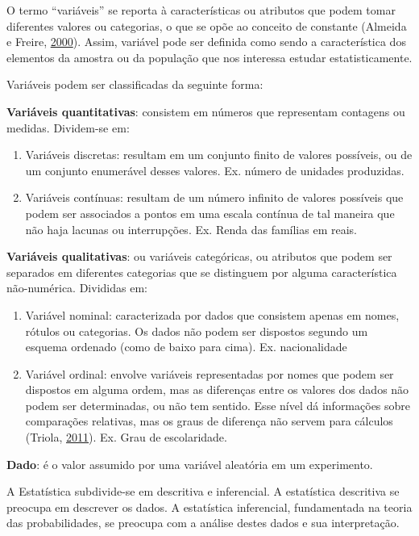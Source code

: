 \documentclass[12pt,brazil,oneside]{book}
\begin{document}
O termo ``variáveis'' se reporta à características ou atributos que podem tomar diferentes valores ou categorias, o que se opõe ao conceito de constante (Almeida e Freire, \protect\hyperlink{ref-almeida2000}{2000}). Assim, variável pode ser definida como sendo a característica dos elementos da amostra ou da população que nos interessa estudar estatisticamente.

Variáveis podem ser classificadas da seguinte forma:

\textbf{Variáveis quantitativas}: consistem em números que representam contagens ou medidas. Dividem-se em:

\begin{enumerate}
\def\labelenumi{\alph{enumi})}
\item
  Variáveis discretas: resultam em um conjunto finito de valores possíveis, ou de um conjunto enumerável desses valores. Ex. número de unidades produzidas.
\item
  Variáveis contínuas: resultam de um número infinito de valores possíveis que podem ser associados a pontos em uma escala contínua de tal maneira que não haja lacunas ou interrupções. Ex. Renda das famílias em reais.
\end{enumerate}

\textbf{Variáveis qualitativas}: ou variáveis categóricas, ou atributos que podem ser separados em diferentes categorias que se distinguem por alguma característica não-numérica. Divididas em:

\begin{enumerate}
\def\labelenumi{\alph{enumi})}
\item
  Variável nominal: caracterizada por dados que consistem apenas em nomes, rótulos ou categorias. Os dados não podem ser dispostos segundo um esquema ordenado (como de baixo para cima). Ex. nacionalidade
\item
  Variável ordinal: envolve variáveis representadas por nomes que podem ser dispostos em alguma ordem, mas as diferenças entre os valores dos dados não podem ser determinadas, ou não tem sentido. Esse nível dá informações sobre comparações relativas, mas os graus de diferença não servem para cálculos (Triola, \protect\hyperlink{ref-triola1999}{2011}). Ex. Grau de escolaridade.
\end{enumerate}

\textbf{Dado}: é o valor assumido por uma variável aleatória em um experimento.

A Estatística subdivide-se em descritiva e inferencial. A estatística descritiva se preocupa em descrever os dados. A estatística inferencial, fundamentada na teoria das probabilidades, se preocupa com a análise destes dados e sua interpretação.
\end{document}
